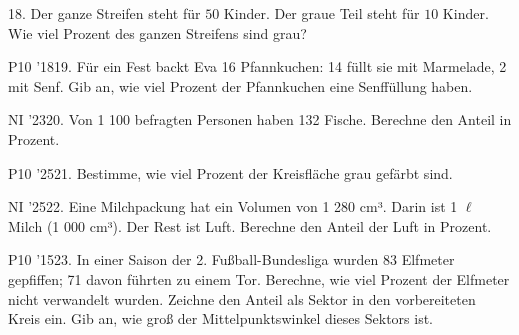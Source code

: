 \documentclass[11pt]{article}
\begin{document}
\pfgruppe{}
\begin{pfaufg}{}{18.}{}
Der ganze Streifen steht für $50$ Kinder. Der graue Teil steht für $10$ Kinder. Wie viel Prozent des ganzen Streifens sind grau?
\par\smallskip\noindent {}\par
{}
\end{pfaufg}
\pfgruppe{}
\begin{pfaufg}{P10 ’18}{19.}{}
Für ein Fest backt Eva 16 Pfannkuchen: 14 füllt sie mit Marmelade, 2 mit Senf. Gib an, wie viel Prozent der Pfannkuchen eine Senffüllung haben.
\end{pfaufg}
\pfgruppe{}
\begin{pfaufg}{NI ’23}{20.}{}
Von 1 100 befragten Personen haben 132 Fische. Berechne den Anteil in Prozent.
\end{pfaufg}
\pfgruppe{}
\begin{pfaufg}{P10 ’25}{21.}{}
Bestimme, wie viel Prozent der Kreisfläche grau gefärbt sind.
\par\smallskip\noindent {}\par
{}
\end{pfaufg}
\pfgruppe{}
\begin{pfaufg}{NI ’25}{22.}{}
Eine Milchpackung hat ein Volumen von 1 280 cm³. Darin ist 1 $\ell$ Milch (1 000 cm³). Der Rest ist Luft. Berechne den Anteil der Luft in Prozent.
\end{pfaufg}
\pfgruppe{}
\begin{pfaufg}{P10 ’15}{23.}{}
In einer Saison der 2. Fußball-Bundesliga wurden 83 Elfmeter gepfiffen; 71 davon führten zu einem Tor. Berechne, wie viel Prozent der Elfmeter nicht verwandelt wurden. Zeichne den Anteil als Sektor in den vorbereiteten Kreis ein. Gib an, wie groß der Mittelpunktswinkel dieses Sektors ist.
\par\smallskip\noindent \kreisleer[2]\par
{}
\end{pfaufg}
\end{document}
